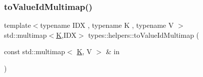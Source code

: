 \mbox{\label{namespacetypes_1_1helpers_aac673b6c2aedf9152a8d3f036c605c5c}} 
\subsubsection{\texorpdfstring{toValueIdMultimap()}{toValueIdMultimap()}}
{\footnotesize\ttfamily template$<$typename I\+DX , typename K , typename V $>$ \\
std\+::multimap$<$\mbox{\hyperlink{graphbuilder__shp_8cpp_a891e241aa245ae63618f03737efba309}{K}},I\+DX$>$ types\+::helpers\+::to\+Value\+Id\+Multimap (\begin{DoxyParamCaption}\item[{const std\+::multimap$<$ \mbox{\hyperlink{graphbuilder__shp_8cpp_a891e241aa245ae63618f03737efba309}{K}}, V $>$ \&}]{in }\end{DoxyParamCaption})}

